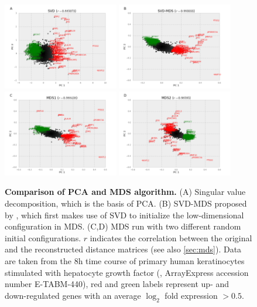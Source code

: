 \begin{figure}[!ht]
\centering
\includegraphics[width=0.45\textwidth]{svd.png}
\includegraphics[width=0.45\textwidth]{svd-mds.png}\\
\includegraphics[width=0.45\textwidth]{mds1.png}
\includegraphics[width=0.45\textwidth]{mds2.png}
\caption[Performance of the MDS algorithm]{
{\bf Comparison of PCA and MDS algorithm.}
(A) Singular 
value decomposition, which is the basis of PCA. (B) SVD-MDS
proposed by \citealp{Becavin2011}, which first makes use of
SVD to initialize the low-dimensional configuration in MDS.
(C,D) MDS run with two different random initial 
configurations. $r$ indicates the correlation between the
original and the reconstructed distance matrices (see also
\ref{sec:mds}). 
Data are taken from the 8h time course of primary human keratinocytes 
stimulated with hepatocyte growth factor (\cite{Busch2008}, 
ArrayExpress accession number E-TABM-440),
red and green labels represent up- and 
down-regulated genes with an average $\log_2$ fold expression 
$> 0.5$. }
\label{fig:svd-mds}
\end{figure}

